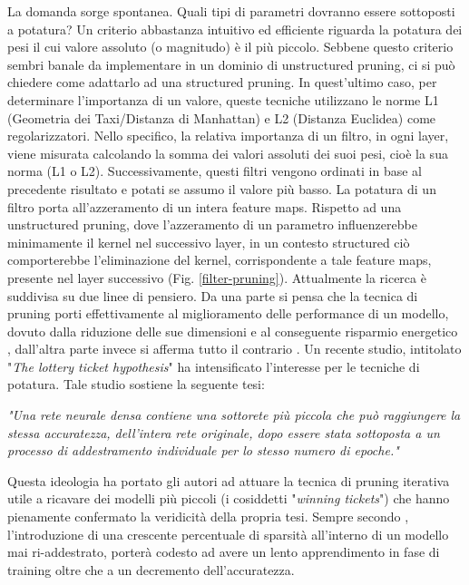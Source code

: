 La domanda sorge spontanea. Quali tipi di parametri dovranno essere 
sottoposti a potatura? Un criterio abbastanza intuitivo ed efficiente riguarda 
la potatura dei pesi il cui valore assoluto (o magnitudo) è il più piccolo. 
Sebbene questo criterio sembri banale da implementare in un dominio di 
unstructured pruning, ci si può chiedere come adattarlo ad una structured 
pruning. In quest'ultimo caso, per determinare l'importanza di un valore, 
queste tecniche utilizzano le norme L1 (Geometria dei Taxi/Distanza di 
Manhattan) e L2 (Distanza Euclidea) come regolarizzatori. Nello specifico, 
la relativa importanza di un filtro, in ogni layer, viene misurata calcolando 
la somma dei valori assoluti dei suoi pesi, cioè la sua norma (L1 o L2). 
Successivamente, questi filtri vengono ordinati in base al precedente risultato 
e potati se assumo il valore più basso. La potatura di un filtro porta 
all'azzeramento di un intera feature maps. Rispetto ad una unstructured 
pruning, dove l'azzeramento di un parametro influenzerebbe minimamente 
il kernel nel successivo layer, in un contesto structured ciò comporterebbe 
l'eliminazione del kernel, corrispondente a tale feature maps, presente nel 
layer successivo (Fig. \ref{filter-pruning}). Attualmente la ricerca è suddivisa su due linee di 
pensiero. Da una parte si pensa che la tecnica di pruning porti effettivamente 
al miglioramento delle performance di un modello, dovuto dalla riduzione 
delle sue dimensioni  \cite{han2015learning} e al conseguente risparmio energetico \cite{yang2017designing}, dall'altra 
parte invece si afferma tutto il contrario \cite{cheng2020survey}. Un recente studio, intitolato 
"\emph{The lottery ticket hypothesis}" \cite{frankle2019lottery} ha intensificato l'interesse per le tecniche 
di potatura. Tale studio sostiene la seguente tesi: 
\begin{displayquote}
    \emph{"Una rete neurale densa contiene una sottorete più piccola che 
    può raggiungere la stessa accuratezza, dell'intera rete originale, 
    dopo essere stata sottoposta a un processo di addestramento 
    individuale per lo stesso numero di epoche."}
\end{displayquote}
Questa ideologia ha portato gli autori ad attuare la tecnica di pruning 
iterativa utile a ricavare dei modelli più piccoli (i cosiddetti "\emph{winning 
tickets}") che hanno pienamente confermato la veridicità della propria tesi.
Sempre secondo \cite{frankle2019lottery}, l'introduzione di una crescente percentuale di sparsità 
all'interno di un modello mai ri-addestrato, porterà codesto ad avere un lento 
apprendimento in fase di training oltre che a un decremento dell'accuratezza.


